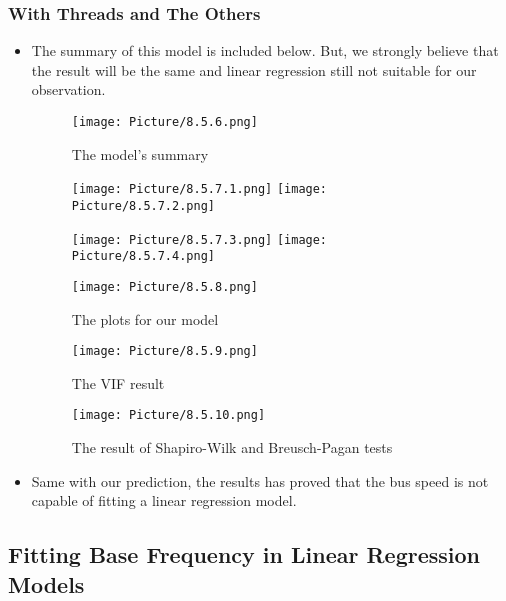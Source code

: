 \documentclass[a4paper]{article}
\begin{document}
\subsubsection{With Threads and The Others}
\begin{itemize}
    \item[] The summary of this model is included below. But, we strongly believe that the result will be the same and linear regression still not suitable for our observation.

    \begin{figure}[H]
        \centering
        \texttt{[image: Picture/8.5.6.png]}
        \caption{The model's summary}
    \end{figure}
 
     \begin{figure}[H]
        \centering
        \texttt{[image: Picture/8.5.7.1.png]}
        \texttt{[image: Picture/8.5.7.2.png]}
    \end{figure}
    
    \begin{figure}[H]
        \centering
        \texttt{[image: Picture/8.5.7.3.png]}
        \texttt{[image: Picture/8.5.7.4.png]}
    \end{figure}
    
    \begin{figure}[H]
        \centering
        \texttt{[image: Picture/8.5.8.png]}
        \caption{The plots for our model}
    \end{figure}
    
    \begin{figure}[H]
        \centering
        \texttt{[image: Picture/8.5.9.png]}
        \caption{The VIF result}
    \end{figure}
    
    \begin{figure}[H]
        \centering
        \texttt{[image: Picture/8.5.10.png]}
        \caption{The result of Shapiro-Wilk and Breusch-Pagan tests}
    \end{figure}
    
    \item[] Same with our prediction, the results has proved that the bus speed is not capable of fitting a linear regression model.
\end{itemize}

\subsection{Fitting Base Frequency in Linear Regression Models}
\end{document}
